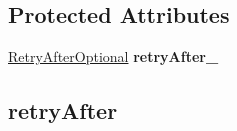 \subsection*{Protected Attributes}
\begin{DoxyCompactItemize}
\item 
\hypertarget{classopenstack_1_1xml_1_1OverLimitAPIFault_ae0c4cd7c892787fc587e3a8719d1c03b}{
\hyperlink{classopenstack_1_1xml_1_1OverLimitAPIFault_a734c2f2998f73b722135849bebd65dd1}{RetryAfterOptional} {\bfseries retryAfter\_\-}}
\label{classopenstack_1_1xml_1_1OverLimitAPIFault_ae0c4cd7c892787fc587e3a8719d1c03b}

\end{DoxyCompactItemize}
\subsection*{retryAfter}
\label{_amgrp73f101ad6ae954650f0124a90428047a}
